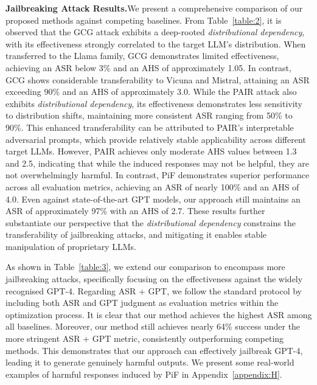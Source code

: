 \textbf{Jailbreaking Attack Results.}\hspace*{2mm}We present a comprehensive comparison of our proposed methods against competing baselines.
From Table~\ref{table:2}, it is observed that the GCG attack exhibits a deep-rooted \emph{distributional dependency}, with its effectiveness strongly correlated to the target LLM's distribution.
When transferred to the Llama family, GCG demonstrates limited effectiveness, achieving an ASR below 3\% and an AHS of approximately 1.05. 
In contrast, GCG shows considerable transferability to Vicuna and Mistral, attaining an ASR exceeding 90\% and an AHS of approximately 3.0.
While the PAIR attack also exhibits \emph{distributional dependency}, its effectiveness demonstrates less sensitivity to distribution shifts, maintaining more consistent ASR ranging from 50\% to 90\%. 
This enhanced transferability can be attributed to PAIR's interpretable adversarial prompts, which provide relatively stable applicability across different target LLMs. 
However, PAIR achieves only moderate AHS values between 1.3 and 2.5, indicating that while the induced responses may not be helpful, they are not overwhelmingly harmful.
In contrast, PiF demonstrates superior performance across all evaluation metrics, achieving an ASR of nearly 100\% and an AHS of 4.0.
Even against state-of-the-art GPT models, our approach still maintains an ASR of approximately 97\% with an AHS of 2.7. 
These results further substantiate our perspective that the \emph{distributional dependency} constrains the transferability of jailbreaking attacks, and mitigating it enables stable manipulation of proprietary LLMs.

As shown in Table~\ref{table:3}, we extend our comparison to encompass more jailbreaking attacks, specifically focusing on the effectiveness against the widely recognised GPT-4.
Regarding ASR + GPT, we follow the standard protocol by including both ASR and GPT judgment as evaluation metrics within the optimization process.
It is clear that our method achieves the highest ASR among all baselines. 
Moreover, our method still achieves nearly 64\% success under the more stringent ASR + GPT metric, consistently outperforming competing methods. 
This demonstrates that our approach can effectively jailbreak GPT-4, leading it to generate genuinely harmful outputs.
We present some real-world examples of harmful responses induced by PiF in Appendix~\ref{appendix:H}.

